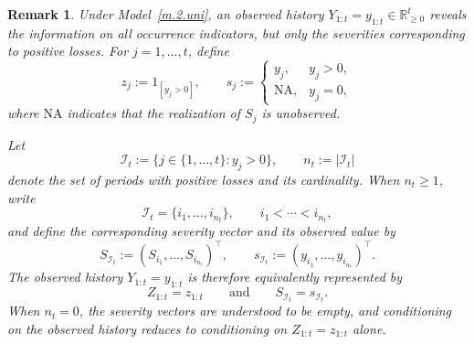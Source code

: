 \documentclass[11pt,authoryear]{elsarticle}
\def\Real{\mathbb{R}}
\newtheorem{remark}{Remark}
\theoremstyle{nopunct}
\numberwithin{equation}{section}
\begin{document}
\begin{remark}\label{rem.1}
Under Model~\ref{m.2.uni}, an observed history
\(Y_{1:t}=y_{1:t}\in\Real_{\ge0}^t\) reveals the information on all occurrence
indicators, but only the severities corresponding to positive losses.
For \(j=1,\ldots,t\), define
\begin{equation}\label{eq.12}
z_j:=1_{[y_j>0]},
\qquad
s_j:=
\begin{cases}
y_j, & y_j>0,\\
\mathrm{NA}, & y_j=0,
\end{cases}
\end{equation}
where \(\mathrm{NA}\) indicates that the realization of \(S_j\)
is unobserved.

Let
\begin{equation}\label{eq.14}
\mathcal I_t
:=
\{j\in\{1,\ldots,t\}:y_j>0\},
\qquad
n_t:=|\mathcal I_t|
\end{equation}
denote the set of periods with positive losses and its cardinality.
When \(n_t\ge1\), write
\[
\mathcal I_t=\{i_1,\ldots,i_{n_t}\},
\qquad
i_1<\cdots<i_{n_t},
\]
and define the corresponding severity vector and its observed value by
\[
S_{\mathcal I_t}
:=
(S_{i_1},\ldots,S_{i_{n_t}})^\top,
\qquad
s_{\mathcal I_t}
:=
(y_{i_1},\ldots,y_{i_{n_t}})^\top.
\]
The observed history \(Y_{1:t}=y_{1:t}\) is therefore
equivalently represented by
\[
Z_{1:t}=z_{1:t}
\qquad\text{and}\qquad
S_{\mathcal I_t}=s_{\mathcal I_t}.
\]
When \(n_t=0\), the severity vectors are understood to be empty,
and conditioning on the observed history reduces to conditioning
on \(Z_{1:t}=z_{1:t}\) alone.
\end{remark}
\end{document}
